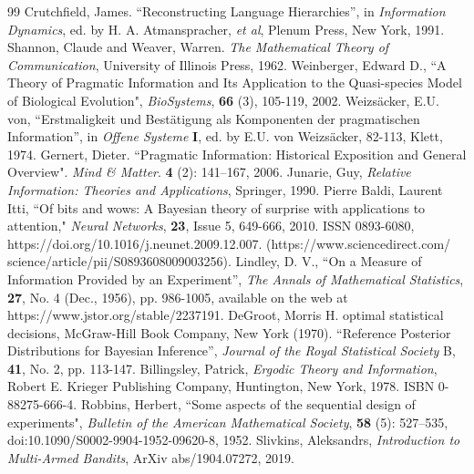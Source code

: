 \documentclass[11pt]{article}
\begin{document}
\begin{thebibliography}{99}
 Crutchfield, James.  ``Reconstructing Language Hierarchies'', in {\it Information Dynamics}, ed. by H. A. Atmanspracher, {\it et al}, Plenum Press, New York, 1991.
  Shannon, Claude and Weaver, Warren. {\it The Mathematical Theory of Communication}, University of Illinois Press, 1962.
 Weinberger, Edward D.,  ``A Theory of Pragmatic Information and Its Application to the Quasi-species Model of Biological Evolution",  {\it BioSystems}, {\bf 66} (3), 105-119, 2002.
 Weizsäcker, E.U. von, ``Erstmaligkeit und Bestätigung als Komponenten der
pragmatischen Information'', in {\it Offene Systeme} {\textbf I}, ed. by E.U. von Weizsäcker, 82-113, Klett, 1974.
 Gernert, Dieter. ``Pragmatic Information: Historical Exposition and General Overview". {\it Mind \& Matter}. {\textbf 4} (2): 141–167, 2006.
 Junarie, Guy, {\it Relative Information:  Theories and Applications}, Springer, 1990.
 Pierre Baldi, Laurent Itti, ``Of bits and wows: A Bayesian theory of surprise with applications to attention," {\it Neural Networks}, {\bf 23}, Issue 5, 649-666, 2010.
ISSN 0893-6080,
https://doi.org/10.1016/j.neunet.2009.12.007.
(https://www.sciencedirect.com/
science/article/pii/S0893608009003256).
 Lindley, D. V., ``On a Measure of Information Provided by an Experiment'', {\it The 
Annals of Mathematical Statistics}, {\bf 27}, No. 4 (Dec., 1956), pp. 986-1005, available on the web at
https://www.jstor.org/stable/2237191.
 DeGroot, Morris H. {optimal statistical decisions}, McGraw-Hill Book Company, New 
York (1970).
 ``Reference Posterior Distributions for Bayesian Inference'', {\it Journal of the Royal 
Statistical Society} B, {\bf 41}, No. 2, pp. 113-147. 
 Billingsley, Patrick, {\it Ergodic Theory and Information}, Robert E. Krieger Publishing Company, Huntington, New York, 1978.  ISBN 0-88275-666-4.
 Robbins, Herbert, ``Some aspects of the sequential design of experiments", {\it Bulletin of the American Mathematical Society}, {\bf 58} (5): 527–535, doi:10.1090/S0002-9904-1952-09620-8, 1952.
 Slivkins, Aleksandrs, {\it Introduction to Multi-Armed Bandits}, ArXiv abs/1904.07272, 2019.  

\end{thebibliography}
\end{document}
